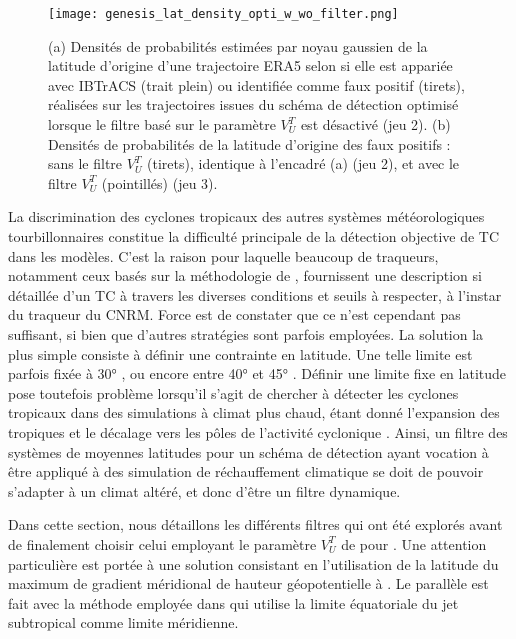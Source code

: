 \documentclass[../main.tex]{subfiles}
\begin{document}
\begin{figure}[tb]
    \centering
    \texttt{[image: genesis\_lat\_density\_opti\_w\_wo\_filter.png]}
    \caption{(a) Densités de probabilités estimées par noyau gaussien de la latitude d'origine d'une trajectoire ERA5 selon si elle est appariée avec IBTrACS
    (trait plein) ou identifiée comme faux positif (tirets), réalisées sur les trajectoires issues du schéma de détection optimisé lorsque le filtre basé sur
    le paramètre $V_U^T$ est désactivé (jeu 2). (b) Densités de probabilités de la latitude d'origine des faux positifs : sans le filtre $V_U^T$ (tirets),
    identique à l'encadré (a) (jeu 2), et avec le filtre $V_U^T$ (pointillés) (jeu 3).}
    \label{fig:lat_density}
\end{figure}

La discrimination des cyclones tropicaux des autres systèmes météorologiques tourbillonnaires constitue la difficulté principale de la détection objective de TC
dans les modèles. C'est la raison pour laquelle beaucoup de traqueurs, notamment ceux basés sur la méthodologie de \textcite{bengtsson_hurricanetype_1995},
fournissent une description si détaillée d'un TC à travers les diverses conditions et seuils à respecter, à l'instar du traqueur du CNRM. Force est de constater
que ce n'est cependant pas suffisant, si bien que d'autres stratégies sont parfois employées. La solution la plus simple consiste à définir une contrainte en
latitude. Une telle limite est parfois fixée à \ang{30} \parencite{bengtsson_simulation_1982,broccoli_can_1990,mcdonald_tropical_2005}, ou encore entre \ang{40}
et \ang{45} \parencite{wu_gcm_1992,tsutsui_simulated_1996,tsutsui_implications_2002,oouchi_tropical_2006,zarzycki_multidecadal_2014}. Définir une limite fixe en
latitude pose toutefois problème lorsqu'il s'agit de chercher à détecter les cyclones tropicaux dans des simulations à climat plus chaud, étant donné
l'expansion des tropiques \parencite{lucas_expanding_2014,staten_reexamining_2018} et le décalage vers les pôles de l'activité cyclonique
\parencite{kossin_poleward_2014,knutson_tropical_2020}. Ainsi, un filtre des systèmes de moyennes latitudes pour un schéma de détection ayant vocation à être
appliqué à des simulation de réchauffement climatique se doit de pouvoir s'adapter à un climat altéré, et donc d'être un filtre dynamique.

Dans cette section, nous détaillons les différents filtres qui ont été explorés avant de finalement choisir celui employant le paramètre $V_U^T$ de
\citeauthor{hart_cyclone_2003} pour \textcite{dulac_assessing_2023}. Une attention particulière est portée à une solution consistant en l'utilisation de la
latitude du maximum de gradient méridional de hauteur géopotentielle à . Le parallèle est fait avec la méthode employée dans
\textcite{bourdin_intercomparison_2022} qui utilise la limite équatoriale du jet subtropical comme limite méridienne.
\end{document}
